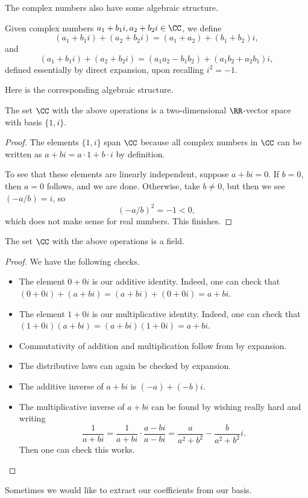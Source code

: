 \documentclass[../notes.tex]{subfiles}
\begin{document}
The complex numbers also have some algebraic structure.
\begin{definition}
	Given complex numbers $a_1+b_1i,a_2+b_2i\in\CC$, we define
	\[(a_1+b_1i)+(a_2+b_2i)=(a_1+a_2)+(b_1+b_2)i,\]
	and
	\[(a_1+b_1i)+(a_2+b_2i)=(a_1a_2-b_1b_2)+(a_1b_2+a_2b_1)i,\]
	defined essentially by direct expansion, upon recalling $i^2=-1$.
\end{definition}
Here is the corresponding algebraic structure.
\begin{proposition}
	The set $\CC$ with the above operations is a two-dimensional $\RR$-vector space with basis $\{1,i\}$.
\end{proposition}
\begin{proof}
	The elements $\{1,i\}$ span $\CC$ because all complex numbers in $\CC$ can be written as $a+bi=a\cdot1+b\cdot i$ by definition.
	
	To see that these elements are linearly independent, suppose $a+bi=0$. If $b=0$, then $a=0$ follows, and we are done. Otherwise, take $b\ne0$, but then we see $(-a/b)=i$, so
	\[(-a/b)^2=-1<0,\]
	which does not make sense for real numbers. This finishes.
\end{proof}
\begin{proposition}
	The set $\CC$ with the above operations is a field.
\end{proposition}
\begin{proof}
	We have the following checks.
	\begin{itemize}
		\item The element $0+0i$ is our additive identity. Indeed, one can check that $(0+0i)+(a+bi)=(a+bi)+(0+0i)=a+bi$.
		\item The element $1+0i$ is our multiplicative identity. Indeed, one can check that $(1+0i)(a+bi)=(a+bi)(1+0i)=a+bi$.
		\item Commutativity of addition and multiplication follow from by expansion.
		\item The distributive laws can again be checked by expansion.
		\item The additive inverse of $a+bi$ is $(-a)+(-b)i$.
		\item The multiplicative inverse of $a+bi$ can be found by wishing really hard and writing
		\[\frac1{a+bi}=\frac1{a+bi}\cdot\frac{a-bi}{a-bi}=\frac a{a^2+b^2}-\frac b{a^2+b^2}i.\]
		Then one can check this works.
		\qedhere
	\end{itemize}
\end{proof}
Sometimes we would like to extract our coefficients from our basis.
\end{document}
